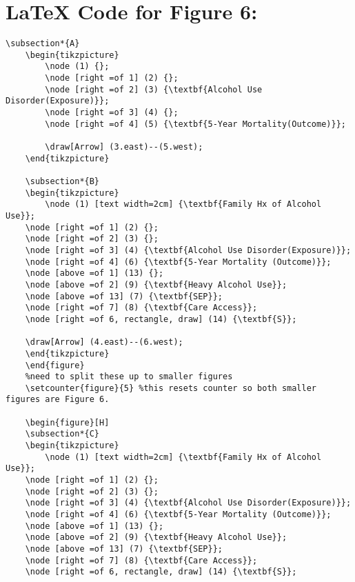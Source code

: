 \documentclass{article}
\begin{document}
\section*{\LaTeX\hspace*{1mm} Code for Figure 6:}
\begin{lstlisting}[frame=single, basicstyle=\ttfamily, linewidth=22.5cm]
    \subsection*{A}
    \begin{tikzpicture}
        \node (1) {};
        \node [right =of 1] (2) {};
        \node [right =of 2] (3) {\textbf{Alcohol Use Disorder(Exposure)}};
        \node [right =of 3] (4) {};
        \node [right =of 4] (5) {\textbf{5-Year Mortality(Outcome)}};
    
        \draw[Arrow] (3.east)--(5.west);
    \end{tikzpicture}
    
    \subsection*{B}
    \begin{tikzpicture}
        \node (1) [text width=2cm] {\textbf{Family Hx of Alcohol Use}};
    \node [right =of 1] (2) {};
    \node [right =of 2] (3) {};
    \node [right =of 3] (4) {\textbf{Alcohol Use Disorder(Exposure)}};
    \node [right =of 4] (6) {\textbf{5-Year Mortality (Outcome)}};
    \node [above =of 1] (13) {};
    \node [above =of 2] (9) {\textbf{Heavy Alcohol Use}};
    \node [above =of 13] (7) {\textbf{SEP}};
    \node [right =of 7] (8) {\textbf{Care Access}};
    \node [right =of 6, rectangle, draw] (14) {\textbf{S}};

    \draw[Arrow] (4.east)--(6.west);
    \end{tikzpicture}
    \end{figure}
    %need to split these up to smaller figures
    \setcounter{figure}{5} %this resets counter so both smaller figures are Figure 6.
    
    \begin{figure}[H]
    \subsection*{C}
    \begin{tikzpicture}
        \node (1) [text width=2cm] {\textbf{Family Hx of Alcohol Use}};
    \node [right =of 1] (2) {};
    \node [right =of 2] (3) {};
    \node [right =of 3] (4) {\textbf{Alcohol Use Disorder(Exposure)}};
    \node [right =of 4] (6) {\textbf{5-Year Mortality (Outcome)}};
    \node [above =of 1] (13) {};
    \node [above =of 2] (9) {\textbf{Heavy Alcohol Use}};
    \node [above =of 13] (7) {\textbf{SEP}};
    \node [right =of 7] (8) {\textbf{Care Access}};
    \node [right =of 6, rectangle, draw] (14) {\textbf{S}};


\end{lstlisting}
\end{document}
